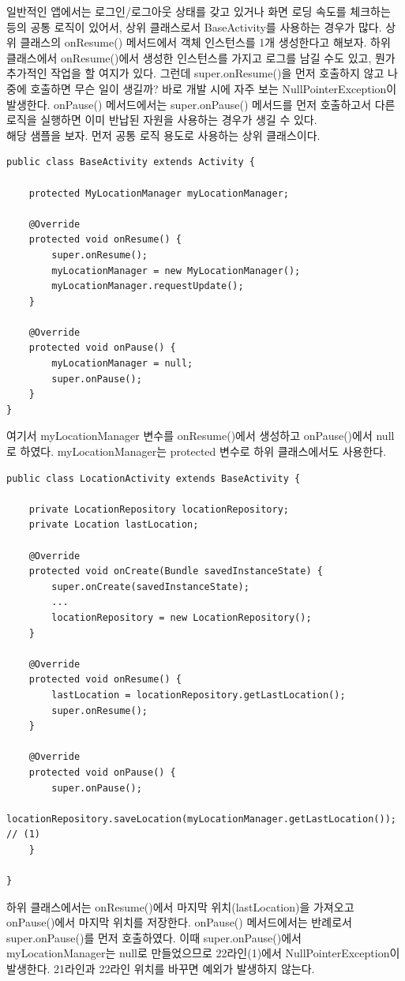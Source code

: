 일반적인 앱에서는 로그인/로그아웃 상태를 갖고 있거나 화면 로딩 속도를 체크하는 등의 공통 로직이 있어서, 상위 클래스로서 BaseActivity를 사용하는 경우가 많다.
상위 클래스의 onResume() 메서드에서 객체 인스턴스를 1개 생성한다고 해보자. 
하위 클래스에서 onResume()에서 생성한 인스턴스를 가지고 로그를 남길 수도 있고, 뭔가 추가적인 작업을 할 여지가 있다. 
그런데 super.onResume()을 먼저 호출하지 않고 나중에 호출하면 무슨 일이 생길까? 바로 개발 시에 자주 보는 NullPointerException이 발생한다.
onPause() 메서드에서는 super.onPause() 메서드를 먼저 호출하고서 다른 로직을 실행하면
이미 반납된 자원을 사용하는 경우가 생길 수 있다.\\

해당 샘플을 보자. 먼저 공통 로직 용도로 사용하는 상위 클래스이다.
\begin{lstlisting}[frame=single]
public class BaseActivity extends Activity {

	protected MyLocationManager myLocationManager;

	@Override
	protected void onResume() {
		super.onResume();
		myLocationManager = new MyLocationManager();
		myLocationManager.requestUpdate();
	}

	@Override
	protected void onPause() {
		myLocationManager = null;
		super.onPause();
	}
}
\end{lstlisting}
여기서 myLocationManager 변수를 onResume()에서 생성하고 onPause()에서 null로 하였다. myLocationManager는 protected 변수로 하위 클래스에서도 사용한다.

\begin{lstlisting}[frame=single]
public class LocationActivity extends BaseActivity {

	private LocationRepository locationRepository;
	private Location lastLocation;

	@Override
	protected void onCreate(Bundle savedInstanceState) {
		super.onCreate(savedInstanceState);
		...
		locationRepository = new LocationRepository();
	}

	@Override
	protected void onResume() {
		lastLocation = locationRepository.getLastLocation();
		super.onResume();
	}

	@Override
	protected void onPause() {
		super.onPause();
		locationRepository.saveLocation(myLocationManager.getLastLocation()); // (1)
	}

}
\end{lstlisting}
하위 클래스에서는 onResume()에서 마지막 위치(lastLocation)을 가져오고 onPause()에서 마지막 위치를 저장한다. onPause() 메서드에서는 반례로서 super.onPause()를 먼저 호출하였다. 이때 super.onPause()에서 myLocationManager는 null로 만들었으므로 22라인(1)에서 NullPointerException이 발생한다. 21라인과 22라인 위치를 바꾸면 예외가 발생하지 않는다. 

